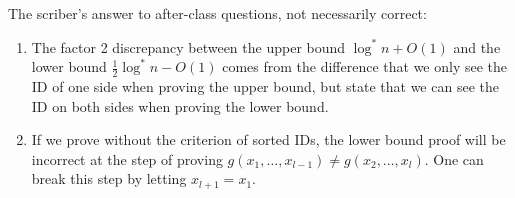 \begin{remark}
	The scriber's answer to after-class questions, not necessarily correct:
	\begin{enumerate}
		\item The factor 2 discrepancy between the upper bound $\log^* n + O(1)$ and the lower bound $\frac{1}{2}\log^* n - O(1)$ comes from the difference that we only see the ID of one side when proving the upper bound, but state that we can see the ID on both sides when proving the lower bound.
		\item If we prove without the criterion of sorted IDs, the lower bound proof will be incorrect at the step of proving $g(x_1, \ldots, x_{l-1}) \neq g(x_2, \ldots, x_l)$. One can break this step by letting $x_{l+1} = x_1$.
	\end{enumerate}
\end{remark}
